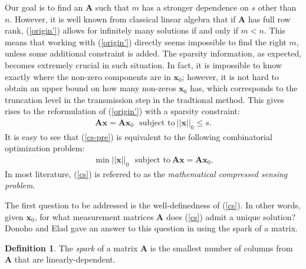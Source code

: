 \documentclass[11pt]{article}
\numberwithin{equation}{section}
\theoremstyle{plain}
\theoremstyle{definition}
\newtheorem{Def}[Th]{Definition}
\def\A{{\mathbf A}}
\def\x{{\mathbf x}}
\begin{document}
Our goal is to find an $\A$ such that $m$ has a stronger dependence on $s$ other than $n$. However, it is well known from classical linear algebra that if $\A$ has full row rank, (\ref{origin'}) allows for infinitely many solutions if and only if $m<n$. This means that working with (\ref{origin'}) directly seems impossible to find the right $m$, unless some additional constraint is added. The sparsity information, as expected, becomes extremely crucial in such situation. In fact, it is impossible to know exactly where the non-zero components are in $\x_0$; however, it is not hard to obtain an upper bound on how many non-zeros $\x_0$ has, which corresponds to the truncation level in the transmission step in the tradtional method. This gives rises to the reformulation of (\ref{origin'}) with a sparsity constraint:  
\begin{align}
\A\x = \A\x_0 \ \ \ \text{subject to}\ ||\x||_0\leq s.\label{cs-pre}
\end{align} 
It is easy to see that (\ref{cs-pre}) is equivalent to the following combinatorial optimization problem:
\begin{align}
\min ||\x||_0 \ \ \ \text{subject to}\ \A\x=\A\x_0.\label{cs}
\end{align} 
In most literature, (\ref{cs}) is referred to as the \emph{mathematical compressed sensing problem}. 

The first question to be addressed is the well-definedness of (\ref{cs}). In other words, given $\x_0$, for what measurement matrices $\A$ does (\ref{cs}) admit a unique solution? Donoho and Elad gave an answer to this question in \cite{donoho2003optimally} using the spark of a matrix. 

\begin{Def}
The \emph{spark} of a matrix $\A$ is the smallest number of columns from $\A$ that are linearly-dependent. 
\end{Def}
\end{document}
